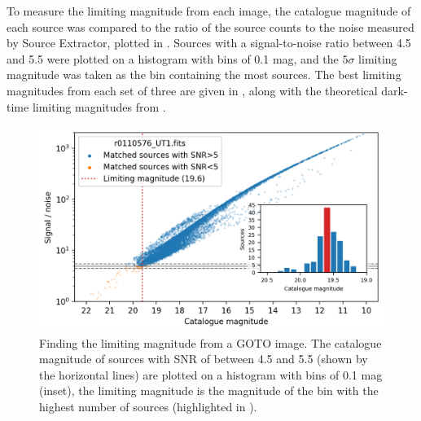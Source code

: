 \begin{colsection}
\begin{colsection}
To measure the limiting magnitude from each image, the catalogue magnitude of each source was compared to the ratio of the source counts to the noise measured by Source Extractor, plotted in . Sources with a signal-to-noise ratio between 4.5 and 5.5 were plotted on a histogram with bins of 0.1 mag, and the $5\sigma$ limiting magnitude was taken as the bin containing the most sources. The best limiting magnitudes from each set of three are given in , along with the theoretical dark-time limiting magnitudes from .

\begin{figure}[t]
    \begin{center}
        \includegraphics[width=\textwidth]{images/throughput/limiting_mag_real.png}
    \end{center}
    \caption[Finding the limiting magnitude from a GOTO image]{
        Finding the limiting magnitude from a GOTO image. The catalogue magnitude of sources with SNR of between 4.5 and 5.5 (shown by the  horizontal lines) are plotted on a histogram with bins of 0.1 mag (inset), the limiting magnitude is the magnitude of the bin with the highest number of sources (highlighted in ).
    }\label{fig:lim_mag}
\end{figure}

\newpage


\end{colsection}
\end{colsection}
